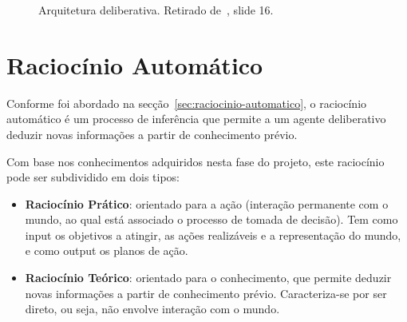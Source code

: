 \begin{figure}[H]
    \begin{center}
    \end{center}
    \caption{Arquitetura deliberativa.
    Retirado de~\cite{isel:iasa:slides:arq-agentes-deliberativos}, slide 16.}
    \label{fig:arquitetura-deliberativa}
\end{figure}


\section{Raciocínio Automático}\label{sec:raciocinio-automatico-1}

Conforme foi abordado na secção~\ref{sec:raciocinio-automatico}, o raciocínio automático é um processo de inferência que permite a um agente deliberativo deduzir novas informações a partir de conhecimento prévio.

Com base nos conhecimentos adquiridos nesta fase do projeto, este raciocínio pode ser subdividido em dois tipos:

\begin{itemize}
    \item \textbf{Raciocínio Prático}: orientado para a ação (interação permanente com o mundo, ao qual está associado o processo de tomada de decisão).
    Tem como input os objetivos a atingir, as ações realizáveis e a representação do mundo, e como output os planos de ação.
    \item \textbf{Raciocínio Teórico}: orientado para o conhecimento, que permite deduzir novas informações a partir de conhecimento prévio.
    Caracteriza-se por ser direto, ou seja, não envolve interação com o mundo.
\end{itemize}

